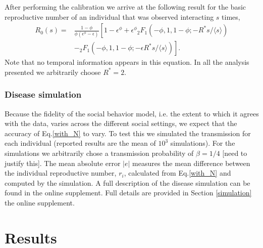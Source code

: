 \documentclass[10pt]{article}
\begin{document}
\begin{multicols}{2}
After performing the calibration we arrive at the following result for the basic reproductive number of an individual that was observed interacting $s$ times,
\begin{equation}
\label{R_0_solution}
\begin{split}
R_{0}(s)=&\frac{1-\phi}{\phi(\epsilon^{\phi}-\epsilon)}\left[1-\epsilon^{\phi}+\epsilon^{\phi}{}_{2}F_{1}(-\phi,1,1-\phi;-R^{*}s/\langle s \rangle)\right.\\
&\left.-{}_{2}F_{1}(-\phi,1,1-\phi;-\epsilon R^{*}s/\langle s \rangle)\right].
\end{split}
\end{equation}
Note that no temporal information appears in this equation. In all the analysis presented we arbitrarily choose $R^{*}=2$. 

\subsubsection{Disease simulation}
Because the fidelity of the social behavior model, i.e. the extent to which it agrees with the data, varies across the different social settings, we expect that the accuracy of Eq.\eqref{with_N} to vary. To test this we simulated the transmission for each individual (reported results are the mean of $10^{3}$ simulations). For the simulations we arbitrarily chose a transmission probability of $\beta=1/4$ [need to justify this]. The mean absolute error $|e|$ measures the mean difference between the individual reproductive number, $r_{i}$, calculated from Eq.\eqref{with_N} and computed by the simulation. A full description of the disease simulation can be found in the online supplement. Full details are provided in Section \ref{simulation} the online supplement.

\section{Results}

\end{multicols}
\end{document}

